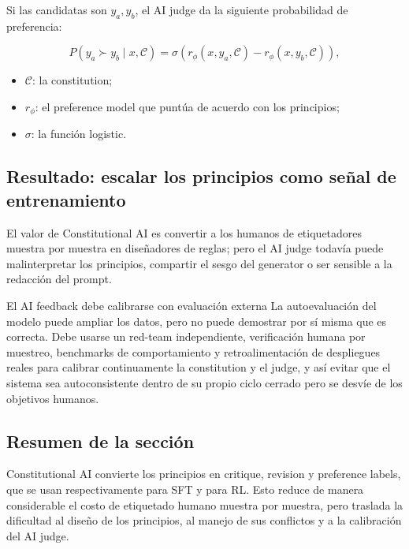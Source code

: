 Si las candidatas son $y_a,y_b$, el AI judge da la siguiente probabilidad de preferencia:

$$
P(y_a\succ y_b\mid x,\mathcal C)
=\sigma\!\left(r_\phi(x,y_a,\mathcal C)-r_\phi(x,y_b,\mathcal C)\right),
$$

\begin{itemize}
    \item $\mathcal C$: la constitution;
    \item $r_\phi$: el preference model que puntúa de acuerdo con los principios;
    \item $\sigma$: la función logistic.
\end{itemize}

\subsection{Resultado: escalar los principios como señal de entrenamiento}


El valor de Constitutional AI es convertir a los humanos de etiquetadores muestra por muestra en diseñadores de reglas; pero el AI judge todavía puede malinterpretar los principios, compartir el sesgo del generator o ser sensible a la redacción del prompt.

\begin{importantbox}{El AI feedback debe calibrarse con evaluación externa}
La autoevaluación del modelo puede ampliar los datos, pero no puede demostrar por sí misma que es correcta. Debe usarse un red-team independiente, verificación humana por muestreo, benchmarks de comportamiento y retroalimentación de despliegues reales para calibrar continuamente la constitution y el judge, y así evitar que el sistema sea autoconsistente dentro de su propio ciclo cerrado pero se desvíe de los objetivos humanos.
\end{importantbox}

\subsection{Resumen de la sección}

Constitutional AI convierte los principios en critique, revision y preference labels, que se usan respectivamente para SFT y para RL. Esto reduce de manera considerable el costo de etiquetado humano muestra por muestra, pero traslada la dificultad al diseño de los principios, al manejo de sus conflictos y a la calibración del AI judge.
